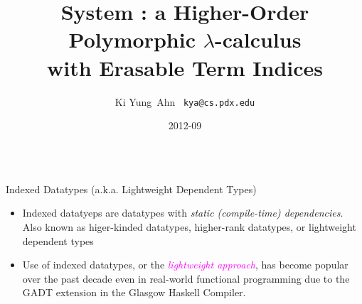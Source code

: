 \documentclass[final]{beamer}
\title[Fancy Posters]{{\VERYHuge System \Fi} {\Huge :}
		{\huge a Higher-Order Polymorphic $\lambda$-calculus} \\
		{\huge with Erasable Term Indices}
  }
\author[Ki Yung Ahn]{ Ki Yung $\,$Ahn $\,$ {\Large\texttt{kya@cs.pdx.edu}} }
\institute[Portland State University]{
	Department of Computer Science, Portland State University }
\date{2012-09}
\begin{document}
\begin{frame}[fragile]
\begin{columns}[t]

\begin{column}{.315\linewidth}

\begin{block}{Indexed Datatypes
	{\normalsize({\small a.k.a. }Lightweight Dependent Types)} }
\begin{itemize}
\item Indexed datatyeps are datatypes
	with \emph{static (compile-time) dependencies}.
	Also known as higer-kinded datatypes, higher-rank datatypes,
	or lightweight dependent types
\item Use of indexed datatypes, or the \textcolor{magenta}{\emph{lightweight approach}},
	has become popular
	over the past decade even in real-world functional programming due to
	the GADT extension in the Glasgow Haskell Compiler.
\end{itemize}
~
\end{block}


\end{column}
\end{columns}
\end{frame}
\end{document}
